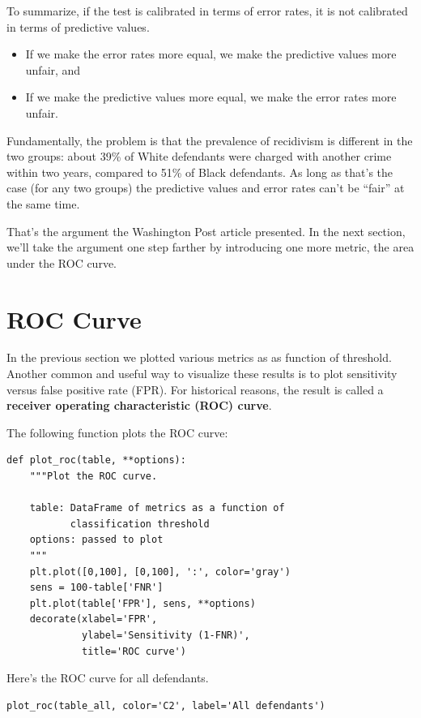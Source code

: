 To summarize, if the test is calibrated in terms of error rates, it is
not calibrated in terms of predictive values.

\begin{itemize}
\item
  If we make the error rates more equal, we make the predictive values
  more unfair, and
\item
  If we make the predictive values more equal, we make the error rates
  more unfair.
\end{itemize}

Fundamentally, the problem is that the prevalence of recidivism is
different in the two groups: about 39\% of White defendants were charged
with another crime within two years, compared to 51\% of Black
defendants. As long as that's the case (for any two groups) the
predictive values and error rates can't be ``fair'' at the same time.

That's the argument the Washington Post article presented. In the next
section, we'll take the argument one step farther by introducing one
more metric, the area under the ROC curve.

\hypertarget{roc-curve}{%
\section{ROC Curve}\label{roc-curve}}

In the previous section we plotted various metrics as as function of
threshold. Another common and useful way to visualize these results is
to plot sensitivity versus false positive rate (FPR). For historical
reasons, the result is called a \textbf{receiver operating
characteristic (ROC) curve}.

The following function plots the ROC curve:

\begin{lstlisting}[]
def plot_roc(table, **options):
    """Plot the ROC curve.
    
    table: DataFrame of metrics as a function of 
           classification threshold
    options: passed to plot
    """
    plt.plot([0,100], [0,100], ':', color='gray')
    sens = 100-table['FNR']
    plt.plot(table['FPR'], sens, **options)
    decorate(xlabel='FPR',
             ylabel='Sensitivity (1-FNR)',
             title='ROC curve')
\end{lstlisting}

Here's the ROC curve for all defendants.

\begin{lstlisting}[]
plot_roc(table_all, color='C2', label='All defendants')
\end{lstlisting}

